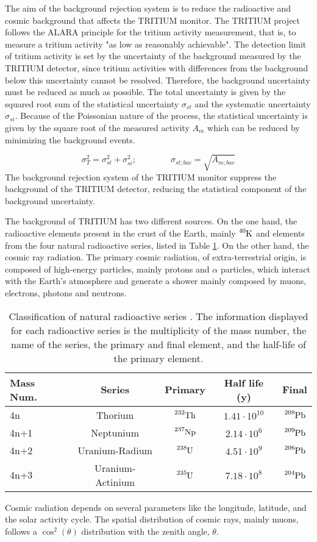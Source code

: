 The aim of the background rejection system is to reduce the radioactive and cosmic background that affects the TRITIUM monitor. The TRITIUM project follows the ALARA principle for the tritium activity measurement, that is, to measure a tritium activity "as low as reasonably achievable". The detection limit of tritium activity is set by the uncertainty of the background measured by the TRITIUM detector, since tritium activities with differences from the background below this uncertainty cannot be resolved. Therefore, the background uncertainty must be reduced as much as possible. The total uncertainty is given by the squared root sum of the statistical uncertainty $\sigma_{st}$ and the systematic uncertainty $\sigma_{si}$. Because of the Poissonian nature of the process, the statistical uncertainty is given by the square root of the measured activity $A_{m}$ which can be reduced by minimizing the background events.

\begin{equation}
\sigma_{T}^2 = \sigma_{st}^2 +\sigma_{si}^2; \qquad \qquad \sigma_{st;bac} = \sqrt{A_{m;bac}}
\label{eq:SquareSumUncerainty}
\end{equation} 
The background rejection system of the TRITIUM monitor suppress the background of the TRITIUM detector, reducing the statistical component of the background uncertainty.

The background of TRITIUM has two different sources. On the one hand, the radioactive elements present in the crust of the Earth, mainly $\ce{^{40}K}$ and elements from the four natural radioactive series, listed in Table \ref{tab:NaturalRadioactiveSeries}. On the other hand, the cosmic ray radiation. The primary cosmic radiation, of extra-terrestrial origin, is composed of high-energy particles, mainly protons and $\alpha$ particles, which interact with the Earth's atmosphere and generate a shower mainly composed by muons, electrons, photons and neutrons.

\begin{table}[htbp]
\centering{}%
\begin{tabular}{lcccc}
\toprule 
Mass Num. & Series & Primary & Half life (y) & Final \tabularnewline
\midrule
\midrule 
4n & Thorium & $\ce{^{232}Th}$ & $1.41 \cdot{} 10^{10}$ & $\ce{^{208}Pb}$ \tabularnewline
4n+1 & Neptunium & $\ce{^{237}Np}$ & $2.14 \cdot{} 10^{6}$ & $\ce{^{209}Pb}$ \tabularnewline
4n+2 & Uranium-Radium & $\ce{^{238}U}$ & $4.51 \cdot{} 10^{9}$ & $\ce{^{206}Pb}$ \tabularnewline
4n+3 & Uranium-Actinium & $\ce{^{235}U}$ & $7.18 \cdot{} 10^{8}$ & $\ce{^{204}Pb}$ \tabularnewline
\bottomrule
\end{tabular}
\caption{Classification of natural radioactive series \cite{NaturalRadioactiveSeries1, NaturalRadioactiveSeries2}. The information displayed for each radioactive series is the multiplicity of the mass number, the name of the series, the primary and final element, and the half-life of the primary element.}
\label{tab:NaturalRadioactiveSeries}
\end{table}
Cosmic radiation depends on several parameters like the longitude, latitude, and the solar activity cycle. The spatial distribution of cosmic rays, mainly muons, follows a $\cos^2(\theta)$ distribution with the zenith angle, $\theta$. 

